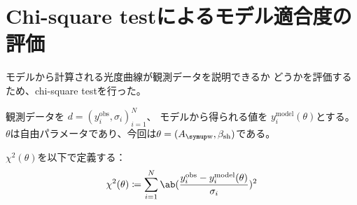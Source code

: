 \documentclass{notebook}
\begin{document}
\section{Chi-square testによるモデル適合度の評価}
モデルから計算される光度曲線が観測データを説明できるか
どうかを評価するため、chi-square testを行った。

観測データを \(d=(y_i^{\mathrm{obs}},\sigma_i)_{i=1}^{N}\)、
モデルから得られる値を \(y_i^{\mathrm{model}}(\theta)\)とする。
$\theta$は自由パラメータであり、今回は\(\theta = (A_{\wind},\beta_{\mathrm{sh}})\)である。

$\chi^2(\theta)$を以下で定義する：
\begin{equation}
  \chi^2(\theta)
  \coloneq
  \sum_{i=1}^{N}
  \ab(
      \frac{y_i^{\mathrm{obs}}-y_i^{\mathrm{model}}(\theta)}{\sigma_i}
  )^2
\end{equation}
\end{document}
